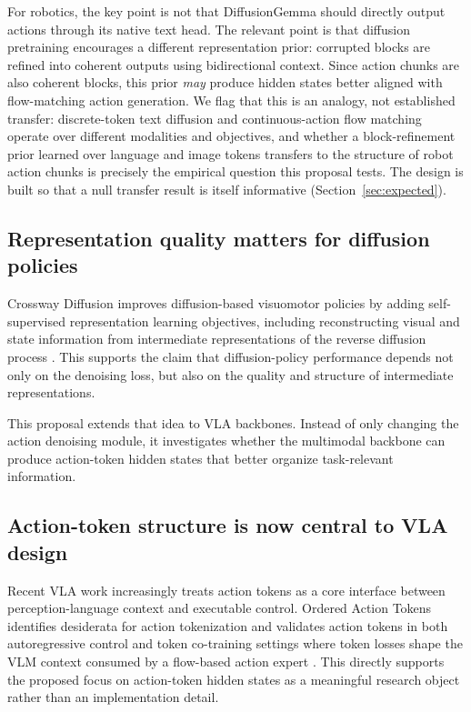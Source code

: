 \documentclass[11pt]{article}
\begin{document}
For robotics, the key point is not that DiffusionGemma should directly output actions through its native text head. The relevant point is that diffusion pretraining encourages a different representation prior: corrupted blocks are refined into coherent outputs using bidirectional context. Since action chunks are also coherent blocks, this prior \emph{may} produce hidden states better aligned with flow-matching action generation. We flag that this is an analogy, not established transfer: discrete-token text diffusion and continuous-action flow matching operate over different modalities and objectives, and whether a block-refinement prior learned over language and image tokens transfers to the structure of robot action chunks is precisely the empirical question this proposal tests. The design is built so that a null transfer result is itself informative (Section~\ref{sec:expected}).

\subsection{Representation quality matters for diffusion policies}

Crossway Diffusion improves diffusion-based visuomotor policies by adding self-supervised representation learning objectives, including reconstructing visual and state information from intermediate representations of the reverse diffusion process \cite{crossway}. This supports the claim that diffusion-policy performance depends not only on the denoising loss, but also on the quality and structure of intermediate representations.

This proposal extends that idea to VLA backbones. Instead of only changing the action denoising module, it investigates whether the multimodal backbone can produce action-token hidden states that better organize task-relevant information.

\subsection{Action-token structure is now central to VLA design}

Recent VLA work increasingly treats action tokens as a core interface between perception-language context and executable control. Ordered Action Tokens identifies desiderata for action tokenization and validates action tokens in both autoregressive control and token co-training settings where token losses shape the VLM context consumed by a flow-based action expert \cite{oat}. This directly supports the proposed focus on action-token hidden states as a meaningful research object rather than an implementation detail.
\end{document}
